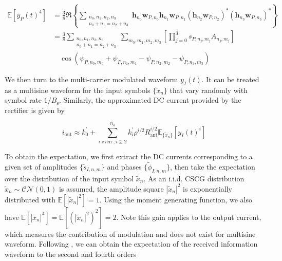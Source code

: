 \begin{align}\label{eqn:power_waveform_fourth_order}
  \mathbb{E}\left[ {{y_P}{{(t)}^4}} \right] &= \frac{3}{8}\Re \left\{ {\sum\limits_{\substack{{n_0},{n_1},{n_2},{n_3} \\ {n_0} + {n_1} = {n_2} + {n_3}}} {{{\mathbf{h}}_{{n_0}}}{{\mathbf{w}}_{P,{n_0}}}{{\mathbf{h}}_{{n_1}}}{{\mathbf{w}}_{P,{n_1}}}{{\left( {{{\mathbf{h}}_{{n_2}}}{{\mathbf{w}}_{P,{n_2}}}} \right)}^*}{{\left( {{{\mathbf{h}}_{{n_3}}}{{\mathbf{w}}_{P,{n_3}}}} \right)}^*}} } \right\} \\
   &= \frac{3}{8}\sum\limits_{\substack{{n_0},{n_1},{n_2},{n_3} \\ {n_0} + {n_1} = {n_2} + {n_3}}} {\sum\limits_{{m_0},{m_1},{m_2},{m_3}} {\left[ {\prod\limits_{j = 0}^3 {{s_{{P},{n_j},{m_j}}}} {A_{{n_j},{m_j}}}} \right] }} \nonumber \\
   &\quad \cos \left( {{\psi _{{P},{n_0},{m_0}}} + {\psi _{{P},{n_1},{m_1}}} - {\psi _{{P},{n_2},{m_2}}} - {\psi _{{P},{n_3},{m_3}}}} \right)
\end{align}

We then turn to the multi-carrier modulated waveform ${y_I}(t)$. It can be treated as a multisine waveform for the input symbols $\{ {{\tilde x}_n}\} $ that vary randomly with symbol rate $1/{B_{\text{s}}}$. Similarly, the approximated DC current provided by the rectifier is given by

\begin{equation}\label{eqn:current_information}
  {i_{\text{out}}} \approx k_0^\prime  + \sum\limits_{i{\text{ even }},i \geqslant 2}^{{n_o}} {k_i^\prime } {\rho ^{i/2}}R_{\text{ant}}^{i/2}{\mathbb{E}_{\{ {{\tilde x}_n}\} }}\left[ {{y_I}{{(t)}^i}} \right]
\end{equation}

To obtain the expectation, we first extract the DC currents corresponding to a given set of amplitudes $\{ {{\tilde s}_{I,n,m}}\} $ and phases $\{ {{\tilde \phi }_{I,n,m}}\} $, then take the expectation over the distribution of the input symbol ${{\tilde x}_n}$. As an i.i.d. CSCG distribution ${{\tilde x}_n}\sim\mathcal{C}\mathcal{N}(0,1)$ is assumed, the amplitude square ${\left| {{{\tilde x}_n}} \right|^2}$ is exponentially distributed with $\mathbb{E}\left[ {{{\left| {{{\tilde x}_n}} \right|}^2}} \right] = 1$. Using the moment generating function, we also have $\mathbb{E}\left[ {{{\left| {{{\tilde x}_n}} \right|}^4}} \right] = \mathbb{E}\left[ {{{\left( {{{\left| {{{\tilde x}_n}} \right|}^2}} \right)}^2}} \right] = 2$. Note this gain applies to the output current, which measures the contribution of modulation and does not exist for multisine waveform. Following \cite{Clerckx2018}, we can obtain the expectation of the received information waveform to the second and fourth orders

